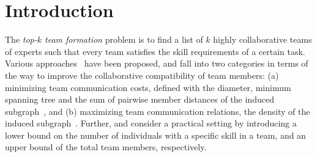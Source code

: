 \section{Introduction}
\label{sec-intro}

The {\em top-$k$ team formation} problem is to find a list of $k$ highly collaborative teams of experts such that every team satisfies the skill requirements of a certain task.
Various approaches~\cite{Lappas09,Kargar11,ArisLuca12,GajewarS12,realTeamForm13,SamikKVM12} have been proposed,
and fall into two categories in terms of the way to improve the collaborative compatibility of team members:
 (a) minimizing team communication costs,
defined with \eg the diameter, minimum spanning tree and the sum of pairwise member distances of the induced subgraph~\cite{Lappas09,Kargar11,ArisLuca12,SamikKVM12}, and
(b) maximizing team communication relations,
\eg the density of the induced subgraph~\cite{GajewarS12,realTeamForm13}.
Further, \cite{GajewarS12} and \cite{realTeamForm13} consider a practical setting by introducing a lower bound on the number of individuals with a specific skill in a team, and an upper bound of the total team members, respectively.




